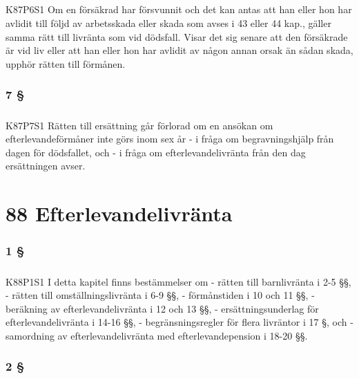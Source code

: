 \documentclass[a4paper,notitlepage,openany,10pt]{book}
\begin{document}
\paragraph*{}
{\tiny K87P6S1}
Om en försäkrad har försvunnit och det kan antas att han eller hon har avlidit till följd av arbetsskada eller skada som avses i 43 eller 44 kap., gäller samma rätt till livränta som vid dödsfall. Visar det sig senare att den försäkrade är vid liv eller att han eller hon har avlidit av någon annan orsak än sådan skada, upphör rätten till förmånen.
\subsection*{7 §}
\paragraph*{}
{\tiny K87P7S1}
Rätten till ersättning går förlorad om en ansökan om efterlevandeförmåner inte görs inom sex år
\newline - i fråga om begravningshjälp från dagen för dödsfallet, och
\newline - i fråga om efterlevandelivränta från den dag ersättningen avser.
\chapter*{88 Efterlevandelivränta}
\subsection*{1 §}
\paragraph*{}
{\tiny K88P1S1}
I detta kapitel finns bestämmelser om
\newline - rätten till barnlivränta i 2-5 §§,
\newline - rätten till omställningslivränta i 6-9 §§,
\newline - förmånstiden i 10 och 11 §§,
\newline - beräkning av efterlevandelivränta i 12 och 13 §§,
\newline - ersättningsunderlag för efterlevandelivränta i 14-16 §§,
\newline - begränsningsregler för flera livräntor i 17 §, och
\newline - samordning av efterlevandelivränta med efterlevandepension i 18-20 §§.
\subsection*{2 §}
\end{document}
